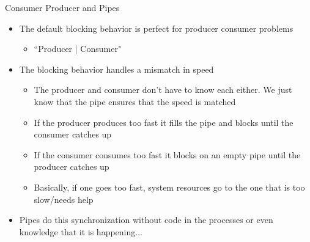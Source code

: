 Consumer Producer and Pipes
\begin{itemize}
    \item The default blocking behavior is perfect for producer consumer problems
    \begin{itemize}
        \item ``Producer | Consumer"
    \end{itemize}
    \item The blocking behavior handles a mismatch in speed
    \begin{itemize}
        \item The producer and consumer don't have to know each either. We just know that the pipe ensures that the speed is matched
        \item If the producer produces too fast it fills the pipe and blocks until the consumer catches up
        \item If the consumer consumes too fast it blocks on an empty pipe until the producer catches up
        \item Basically, if one goes too fast, system resources go to the one that is too slow/needs help
    \end{itemize}
    \item Pipes do this synchronization without code in the processes or even knowledge that it is happening...
\end{itemize}
